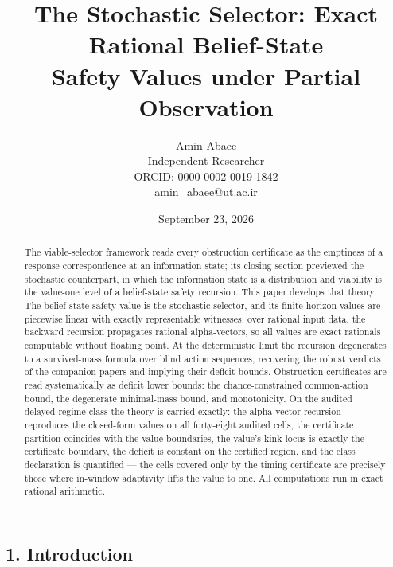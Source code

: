 \documentclass[10pt,twocolumn]{article}
\theoremstyle{definition}
\begin{document}
\title{The Stochastic Selector: Exact Rational Belief-State\\ Safety Values under Partial Observation}
\author{Amin Abaee\\[0.35em]
{\small Independent Researcher}\\[0.55em]
{\small\href{https://orcid.org/0000-0002-0019-1842}{ORCID: 0000-0002-0019-1842}}\\[0.3em]
{\small\href{mailto:amin\_abaee@ut.ac.ir}{amin\_abaee@ut.ac.ir}}}
\date{September 23, 2026}
\maketitle

\begin{abstract}

The viable-selector framework reads every obstruction certificate as the
emptiness of a response correspondence at an information state; its closing
section previewed the stochastic counterpart, in which the information state
is a distribution and viability is the value-one level of a belief-state
safety recursion. This paper develops that theory. The belief-state safety
value is the stochastic selector, and its finite-horizon values are
piecewise linear with exactly representable witnesses: over rational input
data, the backward recursion propagates rational alpha-vectors, so all
values are exact rationals computable without floating point. At the
deterministic limit the recursion degenerates to a survived-mass formula
over blind action sequences, recovering the robust verdicts of the
companion papers and implying their deficit bounds. Obstruction
certificates are read systematically as deficit lower bounds: the
chance-constrained common-action bound, the degenerate minimal-mass bound,
and monotonicity. On the audited delayed-regime class the theory is carried
exactly: the alpha-vector recursion reproduces the closed-form values on
all forty-eight audited cells, the certificate partition coincides with the
value boundaries, the value's kink locus is exactly the certificate
boundary, the deficit is constant on the certified region, and the class
declaration is quantified --- the cells covered only by the timing
certificate are precisely those where in-window adaptivity lifts the value
to one. All computations run in exact rational arithmetic.

\end{abstract}

\subsection{1. Introduction}\label{introduction}
\end{document}
